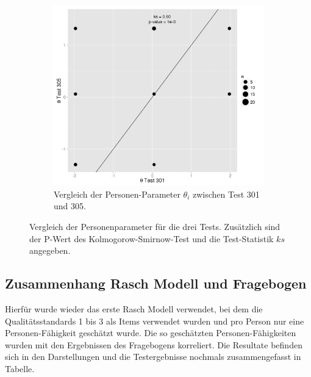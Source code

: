 \begin{figure}[htp]
  \begin{subfigure}{0.5\textwidth}
    \includegraphics[width=1.0\linewidth]{graphics/GOF301305Pers.png}
    \caption{Vergleich der Personen-Parameter $\theta_i$ zwischen Test 301 und 305.}
    \label{fig:GOF301305P}
  \end{subfigure}
 
 \caption{Vergleich der Personenparameter für die drei Tests. Zusätzlich sind der P-Wert des Kolmogorow-Smirnow-Test und die Test-Statistik $ks$ angegeben.}
 \label{fig:GOFP}
 \end{figure}
 
\clearpage 
\subsection{Zusammenhang Rasch Modell und Fragebogen}

Hierfür wurde wieder das erste Rasch Modell verwendet, bei dem die Qualitätsstandards 1 bis 3 als Items verwendet wurden und pro Person nur eine Personen-Fähigkeit geschätzt wurde.
Die so geschätzten Personen-Fähigkeiten wurden mit den Ergebnissen des Fragebogens korreliert. Die Resultate befinden sich in den Darstellungen  und die Testergebnisse nochmals zusammengefasst in Tabelle.

